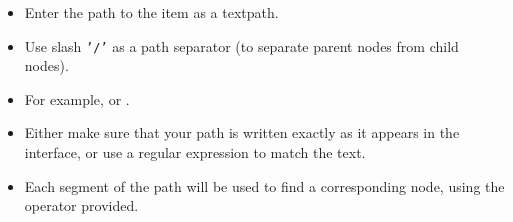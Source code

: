 \begin{itemize}
\item Enter the path to the item as a textpath.
\item Use slash {\tt '/'} as a path separator (to separate parent nodes from child nodes).
\item For example,  or . 
\item Either make sure that your path is written exactly as it appears in the interface, or use a regular expression to match the text.
\item Each segment of the path will be used to find a corresponding node, using the operator provided.
  \end{itemize}

